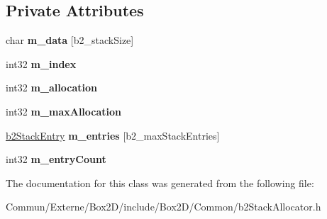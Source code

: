 \subsection*{Private Attributes}
\begin{DoxyCompactItemize}
\item 
char {\bfseries m\+\_\+data} \mbox{[}b2\+\_\+stack\+Size\mbox{]}\hypertarget{classb2_stack_allocator_a8f92993e1115afc12f0a8ef91dafb2db}{}\label{classb2_stack_allocator_a8f92993e1115afc12f0a8ef91dafb2db}

\item 
int32 {\bfseries m\+\_\+index}\hypertarget{classb2_stack_allocator_ad639a2c5f0311d560808a432145880ff}{}\label{classb2_stack_allocator_ad639a2c5f0311d560808a432145880ff}

\item 
int32 {\bfseries m\+\_\+allocation}\hypertarget{classb2_stack_allocator_a111e25a7ddc869c5087ecadf8cd79f13}{}\label{classb2_stack_allocator_a111e25a7ddc869c5087ecadf8cd79f13}

\item 
int32 {\bfseries m\+\_\+max\+Allocation}\hypertarget{classb2_stack_allocator_ab77bbb95bc3506e1a4fdb0f2733a57d9}{}\label{classb2_stack_allocator_ab77bbb95bc3506e1a4fdb0f2733a57d9}

\item 
\hyperlink{structb2_stack_entry}{b2\+Stack\+Entry} {\bfseries m\+\_\+entries} \mbox{[}b2\+\_\+max\+Stack\+Entries\mbox{]}\hypertarget{classb2_stack_allocator_a493e5a470028ffbeea30c1a5e973897e}{}\label{classb2_stack_allocator_a493e5a470028ffbeea30c1a5e973897e}

\item 
int32 {\bfseries m\+\_\+entry\+Count}\hypertarget{classb2_stack_allocator_a8c7f90ede3160a2c3c86cdbd80c22065}{}\label{classb2_stack_allocator_a8c7f90ede3160a2c3c86cdbd80c22065}

\end{DoxyCompactItemize}


The documentation for this class was generated from the following file\+:\begin{DoxyCompactItemize}
\item 
Commun/\+Externe/\+Box2\+D/include/\+Box2\+D/\+Common/b2\+Stack\+Allocator.\+h\end{DoxyCompactItemize}
